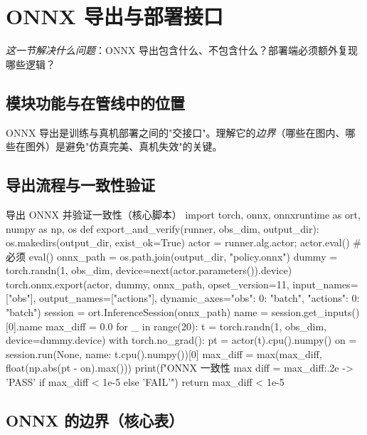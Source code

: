 \section{ONNX 导出与部署接口}
\label{sec:rlmc-train-onnx}

\emph{这一节解决什么问题}：ONNX 导出包含什么、不包含什么？部署端必须额外复现哪些逻辑？

\subsection{模块功能与在管线中的位置}

ONNX 导出是训练与真机部署之间的"交接口"。理解它的\emph{边界}（哪些在图内、哪些在图外）是避免"仿真完美、真机失效"的关键。

\subsection{导出流程与一致性验证}

\begin{codebox}[Python]{导出 ONNX 并验证一致性（核心脚本）}
import torch, onnx, onnxruntime as ort, numpy as np, os
def export_and_verify(runner, obs_dim, output_dir):
    os.makedirs(output_dir, exist_ok=True)
    actor = runner.alg.actor; actor.eval()                 # 必须 eval()
    onnx_path = os.path.join(output_dir, "policy.onnx")
    dummy = torch.randn(1, obs_dim, device=next(actor.parameters()).device)
    torch.onnx.export(actor, dummy, onnx_path, opset_version=11,
        input_names=["obs"], output_names=["actions"],
        dynamic_axes={"obs": {0: "batch"}, "actions": {0: "batch"}})
    session = ort.InferenceSession(onnx_path)
    name = session.get_inputs()[0].name
    max_diff = 0.0
    for _ in range(20):
        t = torch.randn(1, obs_dim, device=dummy.device)
        with torch.no_grad():
            pt = actor(t).cpu().numpy()
        on = session.run(None, {name: t.cpu().numpy()})[0]
        max_diff = max(max_diff, float(np.abs(pt - on).max()))
    print(f"ONNX 一致性 max diff = {max_diff:.2e} -> {'PASS' if max_diff < 1e-5 else 'FAIL'}")
    return max_diff < 1e-5
\end{codebox}

\subsection{ONNX 的边界（核心表）}

